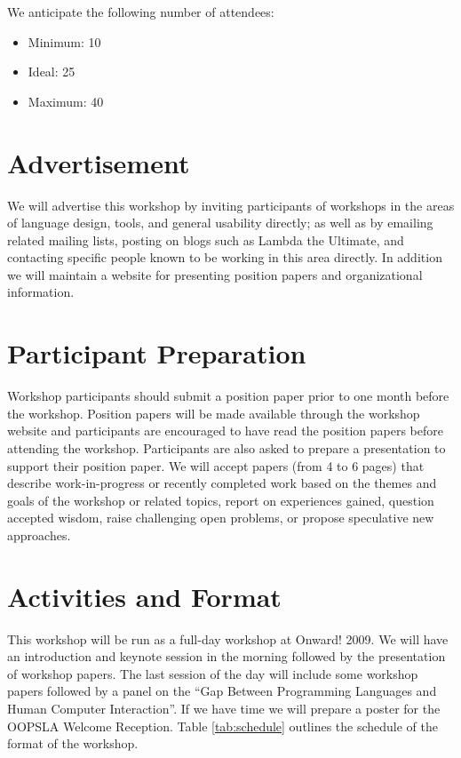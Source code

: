\documentclass{acm_proc_article-sp}
\begin{document}
We anticipate the following number of attendees:

\begin{itemize}
\item Minimum: 10 
\item Ideal: 25 
\item Maximum: 40 
\end{itemize}

\section{Advertisement}

We will advertise this workshop by inviting participants of workshops
in the areas of language design, tools, and general usability
directly; as well as by emailing related mailing lists, posting on
blogs such as Lambda the Ultimate, and contacting specific people
known to be working in this area directly. In addition we will
maintain a website for presenting position papers and organizational
information.

\section{Participant Preparation}

Workshop participants should submit a position paper prior to one
month before the workshop. Position papers will be made available
through the workshop website and participants are encouraged to have
read the position papers before attending the workshop. Participants
are also asked to prepare a presentation to support their position
paper. We will accept papers (from 4 to 6 pages) that describe
work-in-progress or recently completed work based on the themes and
goals of the workshop or related topics, report on experiences gained,
question accepted wisdom, raise challenging open problems, or propose
speculative new approaches.

\section{Activities and Format}

This workshop will be run as a full-day workshop at Onward! 2009. 
We will have an introduction and keynote session in the morning followed 
by the presentation of workshop papers. 
The last session of the day will include some workshop papers followed by 
a panel on the ``Gap Between Programming Languages and Human Computer 
Interaction''.
If we have time we will prepare a poster for the OOPSLA Welcome Reception.
Table \ref{tab:schedule} outlines the schedule of the format of the workshop.
\end{document}
